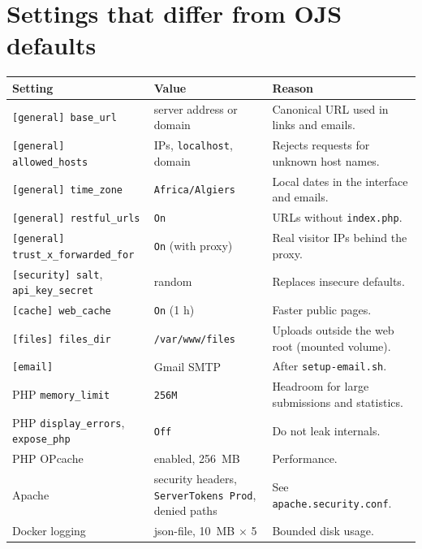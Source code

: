 \documentclass[11pt,a4paper]{report}
\newcommand{\code}[1]{\texttt{\small #1}}
\newcommand{\file}[1]{\texttt{\small #1}}
\begin{document}
\chapter{Settings that differ from OJS defaults}\label{app:settings}
\begin{longtable}{@{}P{5.2cm}P{3.8cm}P{6.4cm}@{}}
\toprule
\textbf{Setting} & \textbf{Value} & \textbf{Reason} \\
\midrule
\endhead
\bottomrule
\endfoot
\code{[general] base\_url} & server address or domain & Canonical URL used in links and emails. \\
\code{[general] allowed\_hosts} & IPs, \code{localhost}, domain & Rejects requests for unknown host names. \\
\code{[general] time\_zone} & \code{Africa/Algiers} & Local dates in the interface and emails. \\
\code{[general] restful\_urls} & \code{On} & URLs without \code{index.php}. \\
\code{[general] trust\_x\_forwarded\_for} & \code{On} (with proxy) & Real visitor IPs behind the proxy. \\
\code{[security] salt}, \code{api\_key\_secret} & random & Replaces insecure defaults. \\
\code{[cache] web\_cache} & \code{On} (1 h) & Faster public pages. \\
\code{[files] files\_dir} & \code{/var/www/files} & Uploads outside the web root (mounted volume). \\
\code{[email]} & Gmail SMTP & After \file{setup-email.sh}. \\
PHP \code{memory\_limit} & \code{256M} & Headroom for large submissions and statistics. \\
PHP \code{display\_errors}, \code{expose\_php} & \code{Off} & Do not leak internals. \\
PHP OPcache & enabled, 256~MB & Performance. \\
Apache & security headers, \code{ServerTokens Prod}, denied paths & See \file{apache.security.conf}. \\
Docker logging & json-file, 10~MB $\times$ 5 & Bounded disk usage. \\
\end{longtable}
\end{document}

